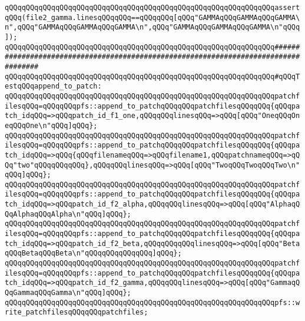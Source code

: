 \verb|qQQqqQQqqQQqqQQqqQQqqQQqqQQqqQQqqQQqqQQqqQQqqQQqqQQqqQQqqQQqqQQqassertqQQq(file2_gamma.linesqQQqqQQq==qQQqqQQq[qQQq"GAMMAqQQqGAMMAqQQqGAMMA\n",qQQq"GAMMAqQQqGAMMAqQQqGAMMA\n",qQQq"GAMMAqQQqGAMMAqQQqGAMMA\n"qQQq]);|\newline
\newline
\newline
\newline
\verb|qQQqqQQqqQQqqQQqqQQqqQQqqQQqqQQqqQQqqQQqqQQqqQQqqQQqqQQqqQQqqQQq####################################################################################|\newline
\verb|qQQqqQQqqQQqqQQqqQQqqQQqqQQqqQQqqQQqqQQqqQQqqQQqqQQqqQQqqQQqqQQq#qQQqTestqQQqappend_to_patch:|\newline
\newline
\verb|qQQqqQQqqQQqqQQqqQQqqQQqqQQqqQQqqQQqqQQqqQQqqQQqqQQqqQQqqQQqqQQqpatchfilesqQQq=qQQqqQQqpfs::append_to_patchqQQqqQQqpatchfilesqQQqqQQq{qQQqpatch_idqQQq=>qQQqpatch_id_f1_one,qQQqqQQqlinesqQQq=>qQQq[qQQq"OneqQQqOneqQQqOne\n"qQQq]qQQq};|\newline
\verb|qQQqqQQqqQQqqQQqqQQqqQQqqQQqqQQqqQQqqQQqqQQqqQQqqQQqqQQqqQQqqQQqpatchfilesqQQq=qQQqqQQqpfs::append_to_patchqQQqqQQqpatchfilesqQQqqQQq{qQQqpatch_idqQQq=>qQQq{qQQqfilenameqQQq=>qQQqfilename1,qQQqpatchnameqQQq=>qQQq"two"qQQqqQQqqQQq},qQQqqQQqlinesqQQq=>qQQq[qQQq"TwoqQQqTwoqQQqTwo\n"qQQq]qQQq};|\newline
\newline
\verb|qQQqqQQqqQQqqQQqqQQqqQQqqQQqqQQqqQQqqQQqqQQqqQQqqQQqqQQqqQQqqQQqpatchfilesqQQq=qQQqqQQqpfs::append_to_patchqQQqqQQqpatchfilesqQQqqQQq{qQQqpatch_idqQQq=>qQQqpatch_id_f2_alpha,qQQqqQQqlinesqQQq=>qQQq[qQQq"AlphaqQQqAlphaqQQqAlpha\n"qQQq]qQQq};|\newline
\verb|qQQqqQQqqQQqqQQqqQQqqQQqqQQqqQQqqQQqqQQqqQQqqQQqqQQqqQQqqQQqqQQqpatchfilesqQQq=qQQqqQQqpfs::append_to_patchqQQqqQQqpatchfilesqQQqqQQq{qQQqpatch_idqQQq=>qQQqpatch_id_f2_beta,qQQqqQQqqQQqlinesqQQq=>qQQq[qQQq"BetaqQQqBetaqQQqBeta\n"qQQqqQQqqQQqqQQq]qQQq};|\newline
\verb|qQQqqQQqqQQqqQQqqQQqqQQqqQQqqQQqqQQqqQQqqQQqqQQqqQQqqQQqqQQqqQQqpatchfilesqQQq=qQQqqQQqpfs::append_to_patchqQQqqQQqpatchfilesqQQqqQQq{qQQqpatch_idqQQq=>qQQqpatch_id_f2_gamma,qQQqqQQqlinesqQQq=>qQQq[qQQq"GammaqQQqGammaqQQqGamma\n"qQQq]qQQq};|\newline
\newline
\verb|qQQqqQQqqQQqqQQqqQQqqQQqqQQqqQQqqQQqqQQqqQQqqQQqqQQqqQQqqQQqqQQqpfs::write_patchfilesqQQqqQQqpatchfiles;|\newline
